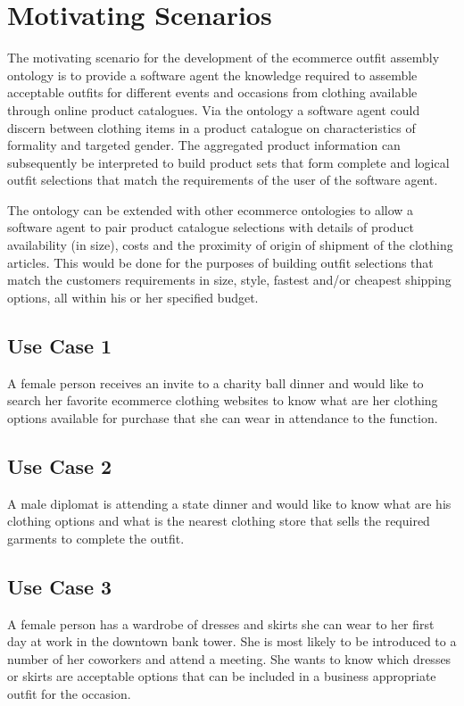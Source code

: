 \documentclass[paper=a4, fontsize=11pt]{scrartcl} %
\numberwithin{equation}{section} %
\numberwithin{figure}{section} %
\numberwithin{table}{section} %
\begin{document}
\section{Motivating Scenarios}
The motivating scenario for the development of the ecommerce outfit assembly ontology is to provide a software agent the knowledge required to assemble acceptable outfits for different events and occasions from clothing available through online product catalogues. Via the ontology a software agent could discern between clothing items in a product catalogue on characteristics of formality and targeted gender. The aggregated product information can subsequently be interpreted to build product sets that form complete and logical outfit selections that match the requirements of the user of the software agent.


The ontology can be extended with other ecommerce ontologies to allow a software agent to pair product catalogue selections with details of product availability (in size), costs and the proximity of origin of shipment of the clothing articles. This would be done for the purposes of building outfit selections that match the customers requirements in size, style, fastest and/or cheapest shipping options, all within his or her specified budget.
\subsection{Use Case 1}
A female person receives an invite to a charity ball dinner and would like to search her favorite ecommerce clothing websites to know what are her clothing options available for purchase that she can wear in attendance to the function.

\subsection{Use Case 2}
A male diplomat is attending a state dinner and would like to know what are his clothing options and what is the nearest clothing store that sells the required garments to complete the outfit.

\subsection{Use Case 3}
A female person has a wardrobe of dresses and skirts she can wear to her first day at work in the downtown bank tower. She is most likely to be introduced to a number of her coworkers and attend a meeting. She wants to know which dresses or skirts are acceptable options that can be included in a business appropriate outfit for the occasion. 
\end{document}
